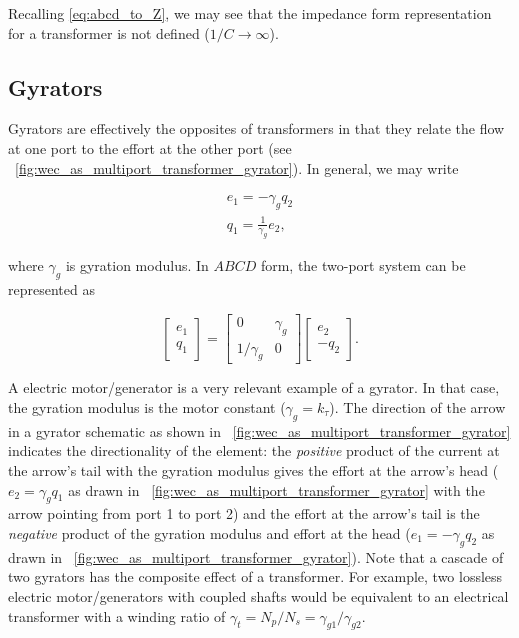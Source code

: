 \documentclass[lettersize,journal]{IEEEtran}
\begin{document}
\noindent{}Recalling \eqref{eq:abcd_to_Z}, we may see that the impedance form representation for a transformer is not defined ($1/C \rightarrow \infty$).

\subsection{Gyrators}\label{sec:gyrators}
Gyrators are effectively the opposites of transformers in that they relate the flow at one port to the effort at the other port (see \figurename~\ref{fig:wec_as_multiport_transformer_gyrator}).
In general, we may write

\begin{subequations}
        \begin{align}
               e_1 = - \gamma_g q_2 \\
               q_1 = \frac{1}{\gamma_g} e_2 ,
        \end{align}
        \label{eq:gyrator_eom}
\end{subequations}

\noindent{}where $\gamma_g$ is gyration modulus.
In $ABCD$ form, the two-port system can be represented as

\begin{equation}
        \begin{bmatrix}
                e_1 \\ q_1
        \end{bmatrix}
        =
        \begin{bmatrix}
                0 & \gamma_g \\ 1/\gamma_g & 0
        \end{bmatrix}
        \begin{bmatrix}
                e_2 \\ - q_2
        \end{bmatrix} .
        \label{eq:gyrator_abcd}
\end{equation}

\noindent{}A electric motor/generator is a very relevant example of a gyrator.
In that case, the gyration modulus is the motor constant ($\gamma_g=k_\tau$).
The direction of the arrow in a gyrator schematic as shown in \figurename~\ref{fig:wec_as_multiport_transformer_gyrator} indicates the directionality of the element: the \emph{positive} product of the current at the arrow's tail with the gyration modulus gives the effort at the arrow's head ($e_2 = \gamma_g q_1$ as drawn in \figurename~\ref{fig:wec_as_multiport_transformer_gyrator} with the arrow pointing from port 1 to port 2) and the effort at the arrow's tail is the \emph{negative} product of the gyration modulus and effort at the head ($e_1= - \gamma_g q_2$ as drawn in \figurename~\ref{fig:wec_as_multiport_transformer_gyrator}).
Note that a cascade of two gyrators has the composite effect of a transformer.
For example, two lossless electric motor/generators with coupled shafts would be equivalent to an electrical transformer with a winding ratio of $\gamma_t=N_p/N_s=\gamma_{g1}/\gamma_{g2}$.
\end{document}
